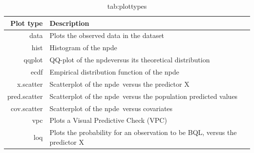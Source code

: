 \documentclass{article}
\def\npde{{\rm npde}}
\def\npd{{\rm npd}}
\def\pd{{\rm pd}}
\begin{document}
\begin{table}[!h]
\begin{center}
\begin{tabular} {| r p{10cm} |}
\hline {\bf Plot type} & {\bf Description} \\
\hline
data & Plots the observed data in the dataset \\
hist & Histogram of the \npde \\
qqplot & QQ-plot of the \npde versus its theoretical distribution  \\
ecdf & Empirical distribution function of the \npde\\
x.scatter & Scatterplot of the \npde~versus the predictor X \\
pred.scatter & Scatterplot of the \npde~versus the population predicted values \\
cov.scatter & Scatterplot of the \npde~versus covariates \\
vpc & Plots a Visual Predictive Check (VPC) \\
loq & Plots the probability for an observation to be BQL, versus the predictor X \\
\hline
\end{tabular}
\end{center}
\caption{Plot types available in the {\sf npde} library. QQ-plots, histograms, cumulative cdf, and scatter plots can be produced for \npde, \pd~or \npd.} \caption{tab:plottypes}
\end{table}
\end{document}
